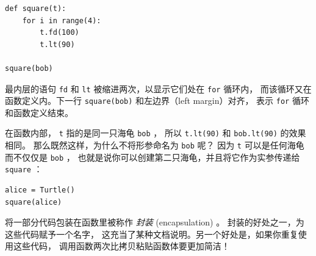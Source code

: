 \begin{lstlisting}
def square(t):
    for i in range(4):
        t.fd(100)
        t.lt(90)

square(bob)
\end{lstlisting}


最内层的语句 \lstinline{fd} 和 \lstinline{lt} 被缩进两次，以显示它们处在 \lstinline{for} 循环内， 而该循环又在函数定义内。下一行 \lstinline{square(bob)} 和左边界（left margin）对齐， 表示 \lstinline{for} 循环和函数定义结束。


在函数内部， \lstinline{t} 指的是同一只海龟 \lstinline{bob} ， 所以 \lstinline{t.lt(90)} 和 \lstinline{bob.lt(90)} 的效果相同。
那么既然这样，为什么不将形参命名为 \lstinline{bob} 呢？ 因为 \lstinline{t} 可以是任何海龟而不仅仅是 \lstinline{bob} ，
也就是说你可以创建第二只海龟，并且将它作为实参传递给 \lstinline{square} ：

\begin{lstlisting}
alice = Turtle()
square(alice)
\end{lstlisting}


将一部分代码包装在函数里被称作 \emph{封装} (encapsulation) 。
封装的好处之一，为这些代码赋予一个名字，
这充当了某种文档说明。另一个好处是，如果你重复使用这些代码，
调用函数两次比拷贝粘贴函数体要更加简洁！


